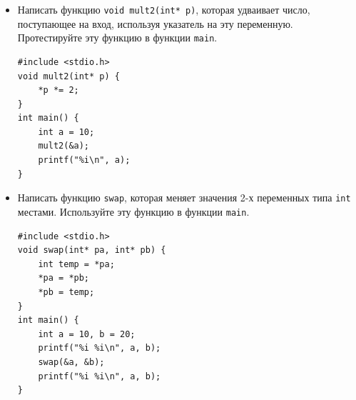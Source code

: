 \documentclass{article}
\begin{document}
\begin{itemize}
\item Написать функцию \texttt{void mult2(int* p)}, которая удваивает число, поступающее на вход, используя указатель на эту переменную. Протестируйте эту функцию в функции \texttt{main}.

\begin{lstlisting}[backgroundcolor = \color{solcolor}]
#include <stdio.h>
void mult2(int* p) {
    *p *= 2;
}
int main() {
    int a = 10;
    mult2(&a);
    printf("%i\n", a);
}
\end{lstlisting}
\item Написать функцию \texttt{swap}, которая меняет значения 2-х переменных типа \texttt{int} местами. Используйте эту функцию в функции \texttt{main}.
\begin{lstlisting}[backgroundcolor = \color{solcolor}]
#include <stdio.h>
void swap(int* pa, int* pb) {
    int temp = *pa;
    *pa = *pb;
    *pb = temp;
}
int main() {
    int a = 10, b = 20;
    printf("%i %i\n", a, b);
    swap(&a, &b);
    printf("%i %i\n", a, b);
}
\end{lstlisting}
\end{itemize}
\end{document}
